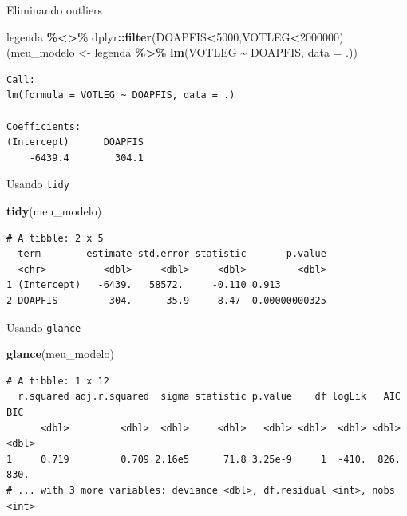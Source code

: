 \documentclass[
  9pt,
  ignorenonframetext,
  aspectratio=169]{beamer}
\newenvironment{Shaded}{\begin{snugshade}}{\end{snugshade}}
\newcommand{\DataTypeTok}[1]{\textcolor[rgb]{0.13,0.29,0.53}{#1}}
\newcommand{\DecValTok}[1]{\textcolor[rgb]{0.00,0.00,0.81}{#1}}
\newcommand{\KeywordTok}[1]{\textcolor[rgb]{0.13,0.29,0.53}{\textbf{#1}}}
\newcommand{\NormalTok}[1]{#1}
\newcommand{\OperatorTok}[1]{\textcolor[rgb]{0.81,0.36,0.00}{\textbf{#1}}}
\newcommand{\StringTok}[1]{\textcolor[rgb]{0.31,0.60,0.02}{#1}}
\begin{document}
\begin{frame}[fragile]{Eliminando outliers}
\protect\hypertarget{eliminando-outliers}{}
\begin{Shaded}
\begin{Highlighting}[]
\NormalTok{legenda }\OperatorTok{\%\textless{}\textgreater{}\%}\StringTok{ }\NormalTok{dplyr}\OperatorTok{::}\KeywordTok{filter}\NormalTok{(DOAPFIS}\OperatorTok{\textless{}}\DecValTok{5000}\NormalTok{,VOTLEG}\OperatorTok{\textless{}}\DecValTok{2000000}\NormalTok{)}
\NormalTok{(meu\_modelo \textless{}{-}}\StringTok{ }\NormalTok{legenda }\OperatorTok{\%\textgreater{}\%}\StringTok{ }\KeywordTok{lm}\NormalTok{(VOTLEG }\OperatorTok{\textasciitilde{}}\StringTok{ }\NormalTok{DOAPFIS, }\DataTypeTok{data =}\NormalTok{ .))}
\end{Highlighting}
\end{Shaded}

\begin{verbatim}
Call:
lm(formula = VOTLEG ~ DOAPFIS, data = .)

Coefficients:
(Intercept)      DOAPFIS  
    -6439.4        304.1  
\end{verbatim}
\end{frame}

\begin{frame}[fragile]{Usando \texttt{tidy}}
\protect\hypertarget{usando-tidy}{}
\begin{Shaded}
\begin{Highlighting}[]
\KeywordTok{tidy}\NormalTok{(meu\_modelo)}
\end{Highlighting}
\end{Shaded}

\begin{verbatim}
# A tibble: 2 x 5
  term        estimate std.error statistic       p.value
  <chr>          <dbl>     <dbl>     <dbl>         <dbl>
1 (Intercept)   -6439.   58572.     -0.110 0.913        
2 DOAPFIS         304.      35.9     8.47  0.00000000325
\end{verbatim}
\end{frame}

\begin{frame}[fragile]{Usando \texttt{glance}}
\protect\hypertarget{usando-glance}{}
\begin{Shaded}
\begin{Highlighting}[]
\KeywordTok{glance}\NormalTok{(meu\_modelo)}
\end{Highlighting}
\end{Shaded}

\begin{verbatim}
# A tibble: 1 x 12
  r.squared adj.r.squared  sigma statistic p.value    df logLik   AIC   BIC
      <dbl>         <dbl>  <dbl>     <dbl>   <dbl> <dbl>  <dbl> <dbl> <dbl>
1     0.719         0.709 2.16e5      71.8 3.25e-9     1  -410.  826.  830.
# ... with 3 more variables: deviance <dbl>, df.residual <int>, nobs <int>
\end{verbatim}
\end{frame}
\end{document}
